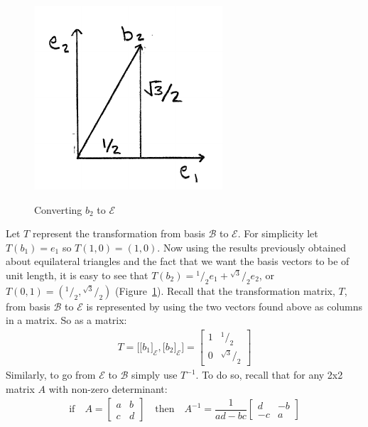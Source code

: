 \documentclass[12pt,letter]{article}
\newcommand*\rfrac[2]{{}^{#1}\!/_{#2}}
\begin{document}
%
\begin{figure}
	\vspace{-20pt}
	\centering
	\caption{Converting $b_2$ to $\mathcal{E}$}
	\includegraphics[width=.3\textwidth]{basis_convert.pdf}
	\vspace{-5pt}
	\label{fig:basis_convert}
	\vspace{-60pt}
\end{figure}
%
Let $T$ represent the transformation from basis $\mathcal{B}$ to $\mathcal{E}$. For simplicity let $T(b_1) = e_1$ so $T(1,0) = (1,0)$. Now using the results previously obtained about equilateral triangles and the fact that we want the basis vectors to be of unit length, it is easy to see that $T(b_2) = \rfrac{1}{2} e_1 + \rfrac {\sqrt{3}}{2} e_2$, or $T(0,1) = (\rfrac{1}{2} , \rfrac{\sqrt{3}}{2})$ (Figure~\ref{fig:basis_convert}). Recall that the transformation matrix, $T$, from basis $\mathcal{B}$ to $\mathcal{E}$ is represented by using the two vectors found above as columns in a matrix. So as a matrix:
%
\begin{align}
	T = \bigg[ \big[b_1\big]_\mathcal{E} , \big[b_2\big]_\mathcal{E}  \bigg]
	= \begin{bmatrix}
		1 &  \rfrac{1}{2}\\
		0 & \rfrac{\sqrt{3}}{2}
	\end{bmatrix}
	\label{eq:T}
\end{align}
%
Similarly, to go from $\mathcal{E}$ to $\mathcal{B}$ simply use $T^{-1}$. To do so, recall that for any 2x2 matrix $A$ with non-zero determinant:
%
\begin{align*}
	\text{if} \quad A =
	\begin{bmatrix}
		a & b \\
		c & d
	\end{bmatrix}
	\quad \text{then} \quad A^{-1} = \dfrac{1}{ad-bc}
	\begin{bmatrix}
		d & -b \\
		-c & a
	\end{bmatrix}
\end{align*} \vspace{-25pt}
\end{document}
